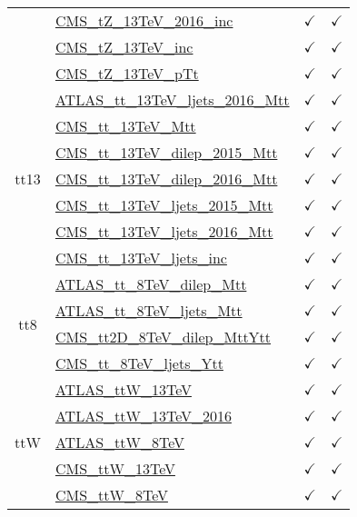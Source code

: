 \documentclass{article}
\begin{document}
\begin{longtable}{|c|l|c|c|}
 & \href{https://arxiv.org}{CMS_tZ_13TeV_2016_inc}  & $\checkmark$ & $\checkmark$\\ \cline{2-4}
 & \href{https://arxiv.org}{CMS_tZ_13TeV_inc}  & $\checkmark$ & $\checkmark$\\ \cline{2-4}
 & \href{https://arxiv.org}{CMS_tZ_13TeV_pTt}  & $\checkmark$ & $\checkmark$
\\ \hline
\multirow{7}{*}{tt13}
 & \href{https://arxiv.org}{ATLAS_tt_13TeV_ljets_2016_Mtt}  & $\checkmark$ & $\checkmark$\\ \cline{2-4}
 & \href{https://arxiv.org}{CMS_tt_13TeV_Mtt}  & $\checkmark$ & $\checkmark$\\ \cline{2-4}
 & \href{https://arxiv.org}{CMS_tt_13TeV_dilep_2015_Mtt}  & $\checkmark$ & $\checkmark$\\ \cline{2-4}
 & \href{https://arxiv.org}{CMS_tt_13TeV_dilep_2016_Mtt}  & $\checkmark$ & $\checkmark$\\ \cline{2-4}
 & \href{https://arxiv.org}{CMS_tt_13TeV_ljets_2015_Mtt}  & $\checkmark$ & $\checkmark$\\ \cline{2-4}
 & \href{https://arxiv.org}{CMS_tt_13TeV_ljets_2016_Mtt}  & $\checkmark$ & $\checkmark$\\ \cline{2-4}
 & \href{https://arxiv.org}{CMS_tt_13TeV_ljets_inc}  & $\checkmark$ & $\checkmark$
\\ \hline
\multirow{4}{*}{tt8}
 & \href{https://arxiv.org}{ATLAS_tt_8TeV_dilep_Mtt}  & $\checkmark$ & $\checkmark$\\ \cline{2-4}
 & \href{https://arxiv.org}{ATLAS_tt_8TeV_ljets_Mtt}  & $\checkmark$ & $\checkmark$\\ \cline{2-4}
 & \href{https://arxiv.org}{CMS_tt2D_8TeV_dilep_MttYtt}  & $\checkmark$ & $\checkmark$\\ \cline{2-4}
 & \href{https://arxiv.org}{CMS_tt_8TeV_ljets_Ytt}  & $\checkmark$ & $\checkmark$
\\ \hline
\multirow{5}{*}{ttW}
 & \href{https://arxiv.org}{ATLAS_ttW_13TeV}  & $\checkmark$ & $\checkmark$\\ \cline{2-4}
 & \href{https://arxiv.org}{ATLAS_ttW_13TeV_2016}  & $\checkmark$ & $\checkmark$\\ \cline{2-4}
 & \href{https://arxiv.org}{ATLAS_ttW_8TeV}  & $\checkmark$ & $\checkmark$\\ \cline{2-4}
 & \href{https://arxiv.org}{CMS_ttW_13TeV}  & $\checkmark$ & $\checkmark$\\ \cline{2-4}
 & \href{https://arxiv.org}{CMS_ttW_8TeV}  & $\checkmark$ & $\checkmark$
\\ \hline

\end{longtable}
\end{document}
